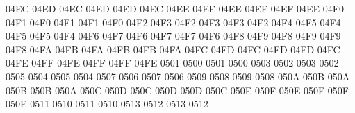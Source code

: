 \setcclcucx 04EC 04ED 04EC %
\setcclcucx 04ED 04ED 04EC %
\setcclcucx 04EE 04EF 04EE %
\setcclcucx 04EF 04EF 04EE %
\setcclcucx 04F0 04F1 04F0 %
\setcclcucx 04F1 04F1 04F0 %
\setcclcucx 04F2 04F3 04F2 %
\setcclcucx 04F3 04F3 04F2 %
\setcclcucx 04F4 04F5 04F4 %
\setcclcucx 04F5 04F5 04F4 %
\setcclcucx 04F6 04F7 04F6 %
\setcclcucx 04F7 04F7 04F6 %
\setcclcucx 04F8 04F9 04F8 %
\setcclcucx 04F9 04F9 04F8 %
\setcclcucx 04FA 04FB 04FA %
\setcclcucx 04FB 04FB 04FA %
\setcclcucx 04FC 04FD 04FC %
\setcclcucx 04FD 04FD 04FC %
\setcclcucx 04FE 04FF 04FE %
\setcclcucx 04FF 04FF 04FE %
 0501 0500 %
 0501 0500 %
 0503 0502 %
 0503 0502 %
 0505 0504 %
 0505 0504 %
 0507 0506 %
 0507 0506 %
 0509 0508 %
 0509 0508 %
\setcclcucx 050A 050B 050A %
\setcclcucx 050B 050B 050A %
\setcclcucx 050C 050D 050C %
\setcclcucx 050D 050D 050C %
\setcclcucx 050E 050F 050E %
\setcclcucx 050F 050F 050E %
 0511 0510 %
 0511 0510 %
 0513 0512 %
 0513 0512 %
